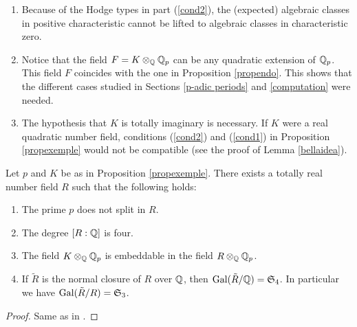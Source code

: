 \documentclass[11pt]{amsart}
\begin{document}
\begin{appendices}
\begin{remark}
\begin{enumerate}
\item Because of the Hodge types in part (\ref{cond2}), the (expected) algebraic classes in positive characteristic cannot be lifted to algebraic classes in characteristic zero.


\item\label{unamattina} Notice that the field $F=K \otimes_{\mathbb{Q}} \mathbb{Q}_p$ can be any quadratic extension of $\mathbb{Q}_p$. This field $F$ coincides with the one in Proposition \ref{propendo}. This shows that the different cases studied in Sections \ref{p-adic periods} and \ref{computation} were needed.
\item The hypothesis that $K$ is totally imaginary is necessary. If $K$ were a real quadratic  number field,  conditions    (\ref{cond2}) and (\ref{cond1}) in Proposition  \ref{propexemple} would not be compatible (see the proof of  Lemma \ref{bellaidea}).
\end{enumerate}
\end{remark}

\begin{lemma}\label{marx}
Let $p$ and $K$ be as in Proposition \ref{propexemple}. There exists a totally real number field $R$  such that the following holds:
\begin{enumerate}
\item  The prime $p$ does not split in $R$.
\item The degree $[R:\mathbb{Q}]$ is four.
\item The field $K \otimes_{\mathbb{Q}} \mathbb{Q}_p$ is embeddable in the field $R \otimes_{\mathbb{Q}} \mathbb{Q}_p$. 
\item If $\tilde{R}$ is the normal closure of $R$ over $\mathbb{Q}$, then $\textnormal{Gal}(\tilde{R}/\mathbb{Q})=\mathfrak{S}_4$. In particular we have $\textnormal{Gal}(\tilde{R}/R)=\mathfrak{S}_3$.
\end{enumerate}
\end{lemma}
\begin{proof}
Same as in \cite[\S 3]{LeOo}.
\end{proof}


\end{appendices}
\end{document}
